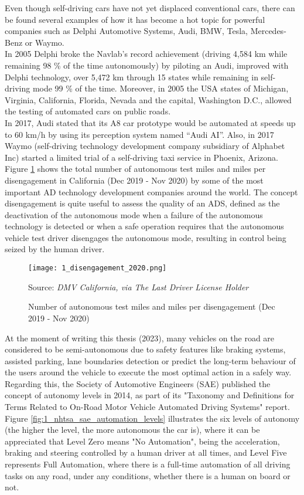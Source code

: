 Even though self-driving cars have not yet displaced conventional cars, there can be found several examples of how it has become a hot topic for powerful companies such as Delphi Automotive Systems, Audi, BMW, Tesla, Mercedes-Benz or Waymo. \\

In 2005 Delphi broke the Navlab’s record achievement (driving 4,584 km while remaining 98 \% of the time autonomously) by piloting an Audi, improved with Delphi technology, over 5,472 km through 15 states while remaining in self-driving mode 99 \% of the time. Moreover, in 2005 the USA states of Michigan, Virginia, California, Florida, Nevada and the capital, Washington D.C., allowed the testing of automated cars on public roads. \\

In 2017, Audi stated that its A8 car prototype would be automated at speeds up to 60 km/h by using its perception system named “Audi AI”.  Also, in 2017 Waymo (self-driving technology development company subsidiary of Alphabet Inc) started a limited trial of a self-driving taxi service in Phoenix, Arizona. \\

Figure \ref{fig:1_disengagement_2020} shows the total number of autonomous test miles and miles per disengagement in California (Dec 2019 - Nov 2020) by some of the most important \ac{AD} technology development companies around the world. The concept disengagement is quite useful to assess the quality of an \ac{ADS}, defined as the deactivation of the autonomous mode when a failure of the autonomous technology is detected or when a safe operation requires that the autonomous vehicle test driver disengages the autonomous mode, resulting in control being seized by the human driver.

\begin{figure}[ht]
	\centering
	\texttt{[image: 1\_disengagement\_2020.png]}
	\caption{Number of autonomous test miles and miles per disengagement (Dec 2019 - Nov 2020)}
	Source: \textit{DMV California, via The Last Driver License Holder}
	\label{fig:1_disengagement_2020}
\end{figure}

At the moment of writing this thesis (2023), many vehicles on the road are considered to be semi-autonomous due to safety features like braking systems, assisted parking, lane boundaries detection or predict the long-term behaviour of the users around the vehicle to execute the most optimal action in a safely way. Regarding this, the Society of Automotive Engineers (SAE) published the concept of autonomy levels in 2014, as part of its "Taxonomy and Definitions for Terms Related to On-Road Motor Vehicle Automated Driving Systems" report. Figure \ref{fig:1_nhtsa_sae_automation_levels} illustrates the six levels of autonomy (the higher the level, the more autonomous the car is), where it can be appreciated that Level Zero means "No Automation", being the acceleration, braking and steering controlled by a human driver at all times, and Level Five represents Full Automation, where there is a full-time automation of all driving tasks on any road, under any conditions, whether there is a human on board or not.

